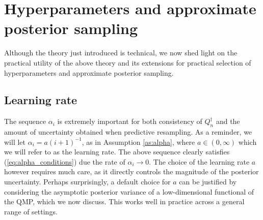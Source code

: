 \documentclass[11pt,a4paper]{article}
\begin{document}
\section{Hyperparameters and approximate posterior sampling}\label{sec:implications}
Although the theory just introduced is technical, we now shed light on the practical utility of the above theory and its extensions for practical selection of hyperparameters and approximate posterior sampling. 

\subsection{Learning rate }\label{sec:learning_rate}

 The sequence $\alpha_i$ is extremely important for both consistency of $Q_n^{\dagger}$ and the amount of uncertainty obtained when predictive resampling. As a reminder, we will let $\alpha_i = a(i+1)^{-1}$, as in {Assumption \ref{as:alpha}},
where $a \in (0,\infty)$ which we will refer to as the learning rate.
The above sequence clearly satisfies (\ref{eq:alpha_conditions}) due the rate of $\alpha_i \to 0$. The choice of the learning rate $a$ however requires much care, as it directly controls the magnitude of the posterior uncertainty. Perhaps surprisingly, a default choice for $a$ can be justified by considering the asymptotic posterior variance of a low-dimensional functional of the QMP, which we now discuss. This works well in practice across a general range of settings.
\end{document}
